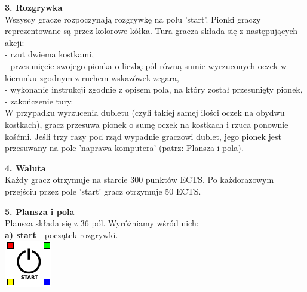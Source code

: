 \documentclass[a4paper]{article}
\begin{document}
\noindent \textbf{3. Rozgrywka}\\
\noindent Wszyscy gracze rozpoczynają rozgrywkę na polu 'start'. Pionki graczy reprezentowane są przez kolorowe kółka. Tura gracza składa się z następujących akcji:\\
- rzut dwiema kostkami,\\
- przesunięcie swojego pionka o liczbę pól równą sumie wyrzuconych oczek w kierunku zgodnym z ruchem wskazówek zegara,\\
- wykonanie instrukcji zgodnie z opisem pola, na który został przesunięty pionek,\\
- zakończenie tury.\\
W przypadku wyrzucenia dubletu (czyli takiej samej ilości oczek na obydwu kostkach), gracz przesuwa pionek o sumę oczek na kostkach i rzuca ponownie kośćmi. Jeśli trzy razy pod rząd wypadnie graczowi dublet, jego pionek jest przesuwany na pole 'naprawa komputera' (patrz: Plansza i pola). 
\vspace{10pt}

\noindent \textbf{4. Waluta}\\
\noindent Każdy gracz otrzymuje na starcie 300 punktów ECTS. Po każdorazowym przejściu przez pole 'start' gracz otrzymuje 50 ECTS.
\vspace{10pt}

\noindent \textbf{5. Plansza i pola}\\
Plansza składa się z 36 pól. Wyróżniamy wśród nich:\\
\noindent \textbf{a) start} - początek rozgrywki.\\ 
\indent\includegraphics[scale=0.8]{start.png}\\
\end{document}
